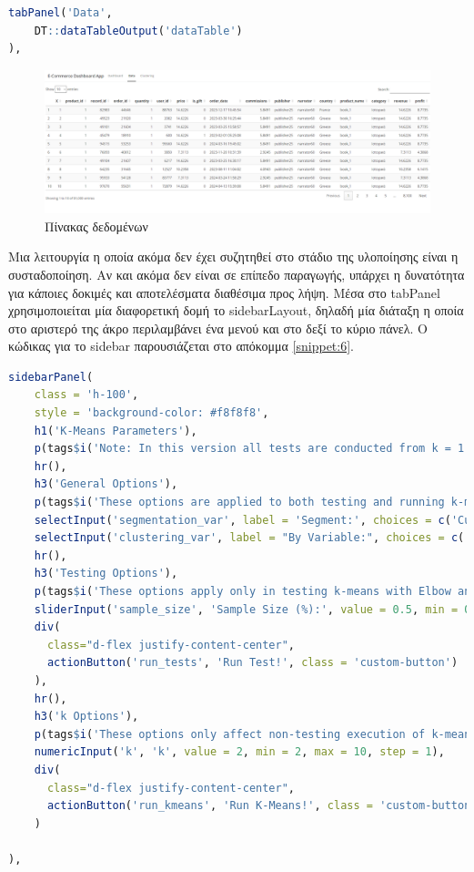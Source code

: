 \documentclass[greek, 12pt]{article}
\begin{document}
\begin{lstlisting}[language=R, caption=Κώδικας για τον πίνακα δεδομένων, label={snippet:5}]
tabPanel('Data',       
    DT::dataTableOutput('dataTable')
),
\end{lstlisting}

\begin{figure}[h]
    \centering
    \includegraphics[width=\textwidth]{pictures/13_data_table.png}
    \caption{Πίνακας δεδομένων}
    \label{fig:13}
\end{figure}

Μια λειτουργία η οποία ακόμα δεν έχει συζητηθεί στο στάδιο της υλοποίησης είναι η συσταδοποίηση. Αν και ακόμα δεν είναι σε επίπεδο παραγωγής, υπάρχει η δυνατότητα για κάποιες δοκιμές και αποτελέσματα διαθέσιμα προς λήψη. Μέσα στο tabPanel χρησιμοποιείται μία διαφορετική δομή το sidebarLayout, δηλαδή μία διάταξη η οποία στο αριστερό της άκρο περιλαμβάνει ένα μενού και στο δεξί το κύριο πάνελ. Ο κώδικας για το sidebar παρουσιάζεται στο απόκομμα \ref{snippet:6}.

\begin{lstlisting}[language=R, caption=Κώδικας του sidebar, label={snippet:6}]
sidebarPanel(
    class = 'h-100',
    style = 'background-color: #f8f8f8',
    h1('K-Means Parameters'),
    p(tags$i('Note: In this version all tests are conducted from k = 1 to 10')),
    hr(),
    h3('General Options'),
    p(tags$i('These options are applied to both testing and running k-means')),
    selectInput('segmentation_var', label = 'Segment:', choices = c('Customers' = 'user_id', 'Orders' = 'order_id')),
    selectInput('clustering_var', label = "By Variable:", choices = c('Category' = 'category', 'Narrator' = 'narrator')),
    hr(),
    h3('Testing Options'),
    p(tags$i('These options apply only in testing k-means with Elbow and Silhouette Method')),
    sliderInput('sample_size', 'Sample Size (%):', value = 0.5, min = 0, max = 1, step = 0.01),
    div(
      class="d-flex justify-content-center",
      actionButton('run_tests', 'Run Test!', class = 'custom-button')
    ),
    hr(),
    h3('k Options'),
    p(tags$i('These options only affect non-testing execution of k-means')),
    numericInput('k', 'k', value = 2, min = 2, max = 10, step = 1),
    div(
      class="d-flex justify-content-center",
      actionButton('run_kmeans', 'Run K-Means!', class = 'custom-button')
    )
    
),
\end{lstlisting}
\end{document}
